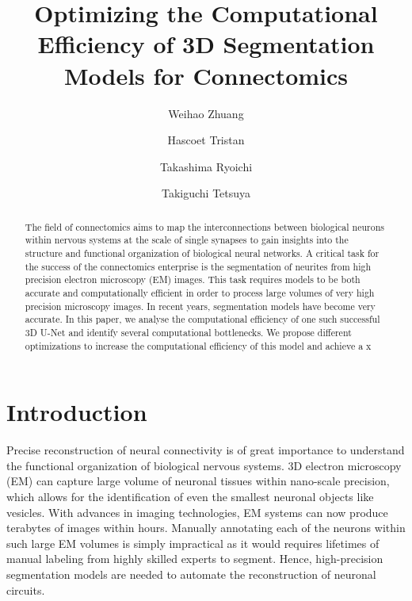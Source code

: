 \documentclass[runningheads]{llncs}
\begin{document}
%
\title{Optimizing the Computational Efficiency of 3D Segmentation Models for Connectomics}
%
%
\author{
Weihao Zhuang   %
\and
Hascoet Tristan  %
\and
Takashima Ryoichi %
\and
Takiguchi Tetsuya %
}
%
%


\maketitle              %
%
\begin{abstract}
The field of connectomics aims to map the interconnections between biological neurons within nervous systems at the scale of single synapses to gain insights into the structure and functional organization of biological neural networks. A critical task for the success of the connectomics enterprise is the segmentation of neurites from high precision electron microscopy (EM) images. This task requires models to be both accurate and computationally efficient in order to process large volumes of very high precision microscopy images. In recent years, segmentation models have become very accurate. In this paper, we analyse the computational efficiency of one such successful 3D U-Net and identify several computational bottlenecks. We propose different optimizations to increase the computational efficiency of this model and achieve a x%

\end{abstract}
%
%
%




\section{Introduction}
Precise reconstruction of neural connectivity is of great importance to understand the functional organization of biological nervous systems. 3D electron microscopy (EM) can capture large volume of neuronal tissues within nano-scale precision, which allows for the identification of even the smallest neuronal objects like vesicles. With advances in imaging technologies, EM systems can now produce terabytes of images within hours. Manually annotating each of the neurons within such large EM volumes is simply impractical as it would requires lifetimes of manual labeling from highly skilled experts to segment. Hence, high-precision segmentation models are needed to automate the reconstruction of neuronal circuits. 
\end{document}
